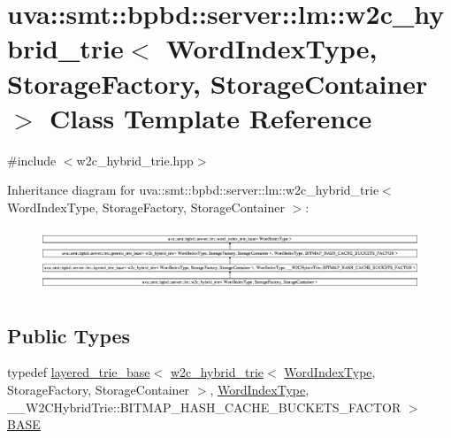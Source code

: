 \hypertarget{classuva_1_1smt_1_1bpbd_1_1server_1_1lm_1_1w2c__hybrid__trie}{}\section{uva\+:\+:smt\+:\+:bpbd\+:\+:server\+:\+:lm\+:\+:w2c\+\_\+hybrid\+\_\+trie$<$ Word\+Index\+Type, Storage\+Factory, Storage\+Container $>$ Class Template Reference}
\label{classuva_1_1smt_1_1bpbd_1_1server_1_1lm_1_1w2c__hybrid__trie}


{\ttfamily \#include $<$w2c\+\_\+hybrid\+\_\+trie.\+hpp$>$}

Inheritance diagram for uva\+:\+:smt\+:\+:bpbd\+:\+:server\+:\+:lm\+:\+:w2c\+\_\+hybrid\+\_\+trie$<$ Word\+Index\+Type, Storage\+Factory, Storage\+Container $>$\+:\begin{figure}[H]
\begin{center}
\leavevmode
\includegraphics[height=1.909633cm]{classuva_1_1smt_1_1bpbd_1_1server_1_1lm_1_1w2c__hybrid__trie}
\end{center}
\end{figure}
\subsection*{Public Types}
\begin{DoxyCompactItemize}
\item 
typedef \hyperlink{classuva_1_1smt_1_1bpbd_1_1server_1_1lm_1_1layered__trie__base}{layered\+\_\+trie\+\_\+base}$<$ \hyperlink{classuva_1_1smt_1_1bpbd_1_1server_1_1lm_1_1w2c__hybrid__trie}{w2c\+\_\+hybrid\+\_\+trie}$<$ \hyperlink{classuva_1_1smt_1_1bpbd_1_1server_1_1lm_1_1word__index__trie__base_a64279b5b94c421b25aedaa72e73d013c}{Word\+Index\+Type}, Storage\+Factory, Storage\+Container $>$, \hyperlink{classuva_1_1smt_1_1bpbd_1_1server_1_1lm_1_1word__index__trie__base_a64279b5b94c421b25aedaa72e73d013c}{Word\+Index\+Type}, \+\_\+\+\_\+\+W2\+C\+Hybrid\+Trie\+::\+B\+I\+T\+M\+A\+P\+\_\+\+H\+A\+S\+H\+\_\+\+C\+A\+C\+H\+E\+\_\+\+B\+U\+C\+K\+E\+T\+S\+\_\+\+F\+A\+C\+T\+O\+R $>$ \hyperlink{classuva_1_1smt_1_1bpbd_1_1server_1_1lm_1_1w2c__hybrid__trie_af338d2a485c15b92846dc6123fa0a305}{B\+A\+S\+E}
\end{DoxyCompactItemize}
